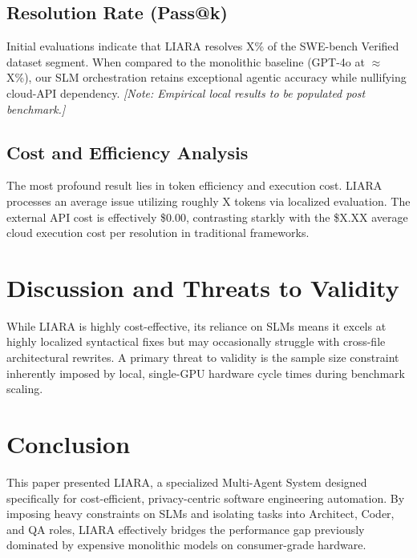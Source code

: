\documentclass[10pt,journal,compsoc]{IEEEtran}
\begin{document}
\subsection{Resolution Rate (Pass@k)}
Initial evaluations indicate that LIARA resolves X\% of the SWE-bench Verified dataset segment. When compared to the monolithic baseline (GPT-4o at $\approx$ X\%), our SLM orchestration retains exceptional agentic accuracy while nullifying cloud-API dependency. 
\textit{[Note: Empirical local results to be populated post benchmark.]}

\subsection{Cost and Efficiency Analysis}
The most profound result lies in token efficiency and execution cost. LIARA processes an average issue utilizing roughly X tokens via localized evaluation. The external API cost is effectively \$0.00, contrasting starkly with the \$X.XX average cloud execution cost per resolution in traditional frameworks. 

\section{Discussion and Threats to Validity}
\label{sec:discussion}
While LIARA is highly cost-effective, its reliance on SLMs means it excels at highly localized syntactical fixes but may occasionally struggle with cross-file architectural rewrites. A primary threat to validity is the sample size constraint inherently imposed by local, single-GPU hardware cycle times during benchmark scaling.

\section{Conclusion}
\label{sec:conclusion}
This paper presented LIARA, a specialized Multi-Agent System designed specifically for cost-efficient, privacy-centric software engineering automation. By imposing heavy constraints on SLMs and isolating tasks into Architect, Coder, and QA roles, LIARA effectively bridges the performance gap previously dominated by expensive monolithic models on consumer-grade hardware.


\end{document}
